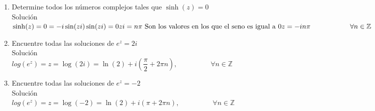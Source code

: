 \begin{enumerate}
\item Determine todos los n\'umeros complejos tales que $\sinh(z) = 0$\\
Soluci\'on\\
$\sinh(z) = 0 = -i\sin(zi) \\
	\sin(zi) = 0\\
	zi = n\pi \text{ Son los valores en los que el seno es igual a 0}\\
	z = -in \pi \hspace{2cm} \forall n\in \mathbb{Z}$

\item Encuentre todas las soluciones de ${e}^{z} = 2i$\\
Soluci\'on\\
$log(e^z)=z = \log(2i) = \ln(2) +i(\dfrac{\pi}{2}+2\pi n), \hspace{2cm} \forall n\in \mathbb{Z}$
\item Encuentre todas las soluciones de ${e}^{z} = -2$\\
Soluci\'on\\
$log(e^z)=z = \log(-2) = \ln(2) +i(\pi+2\pi n), \hspace{2cm} \forall n\in \mathbb{Z}$
\end{enumerate}	
